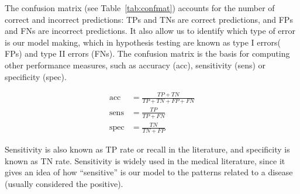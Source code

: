 The confusion matrix (see Table~\ref{tab:confmat}) accounts for the number of correct and incorrect predictions: \acp{TP} and \acp{TN} are correct predictions, and \acp{FP} and \acp{FN} are incorrect predictions. It also allow us to identify which type of error is our model making, which in hypothesis testing are known as type I errors( \acp{FP}) and type II errors (\acp{FN}). The confusion matrix is the basis for computing other performance measures, such as accuracy (acc), sensitivity (sens) or specificity (spec).

\begin{align}
\text{acc} & = \frac{TP + TN}{TP + TN + FP + FN}\\
\text{sens} & = \frac{TP}{TP + FN}\\
\text{spec} & = \frac{TN}{TN + FP}
\end{align}

Sensitivity is also known as \ac{TP} rate or recall in the literature, and specificity is known as \ac{TN} rate. Sensitivity is widely used in the medical literature, since it gives an idea of how ``sensitive'' is our model to the patterns related to a disease (usually considered the positive). 
